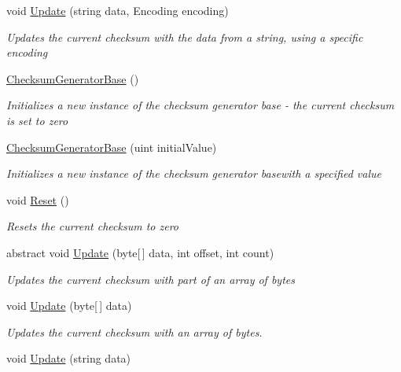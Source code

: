 \begin{DoxyCompactItemize}
void \hyperlink{class_dot_z_lib_1_1_checksum_generator_base_ad8e1adfbbfcc12ab74c772f3292bfee3}{Update} (string data, Encoding encoding)
\begin{DoxyCompactList}\small\item\em Updates the current checksum with the data from a string, using a specific encoding \end{DoxyCompactList}\item 
\hyperlink{class_dot_z_lib_1_1_checksum_generator_base_a4c13ec1d2cb08abadffb2c70cb4ba258}{Checksum\+Generator\+Base} ()
\begin{DoxyCompactList}\small\item\em Initializes a new instance of the checksum generator base -\/ the current checksum is set to zero \end{DoxyCompactList}\item 
\hyperlink{class_dot_z_lib_1_1_checksum_generator_base_ab36da84d395361311a45e88797ae8c69}{Checksum\+Generator\+Base} (uint initial\+Value)
\begin{DoxyCompactList}\small\item\em Initializes a new instance of the checksum generator basewith a specified value \end{DoxyCompactList}\item 
void \hyperlink{class_dot_z_lib_1_1_checksum_generator_base_a78ec9de09223c6f9f81e4a32d8d00b70}{Reset} ()
\begin{DoxyCompactList}\small\item\em Resets the current checksum to zero \end{DoxyCompactList}\item 
abstract void \hyperlink{class_dot_z_lib_1_1_checksum_generator_base_a7844da3e1f8af01d7cde34f3056bf24b}{Update} (byte\mbox{[}$\,$\mbox{]} data, int offset, int count)
\begin{DoxyCompactList}\small\item\em Updates the current checksum with part of an array of bytes \end{DoxyCompactList}\item 
void \hyperlink{class_dot_z_lib_1_1_checksum_generator_base_a3fafe3e0c2fa80fb2cbbdce82a76bc84}{Update} (byte\mbox{[}$\,$\mbox{]} data)
\begin{DoxyCompactList}\small\item\em Updates the current checksum with an array of bytes. \end{DoxyCompactList}\item 
void \hyperlink{class_dot_z_lib_1_1_checksum_generator_base_a4f0a5411dbb86714571852000932d66e}{Update} (string data)

\end{DoxyCompactItemize}
